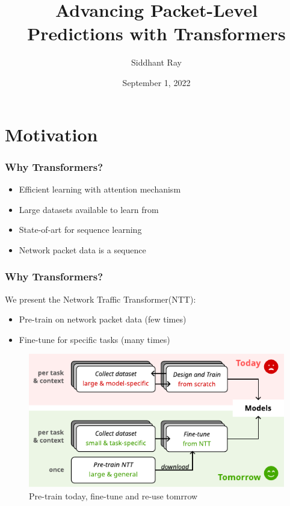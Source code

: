 \documentclass{beamer}
\title[Master Thesis] %
{Advancing Packet-Level Predictions with Transformers}
\date{September 1, 2022}
\author[Siddhant Ray] %
{Siddhant Ray}
\institute[ETH Zürich] %
{
  Dept. of Information Technology and Electrical Engineering(D-ITET) \\
  ETH Zürich
}
\begin{document}
\frame{\titlepage}


%


\section{Motivation}

\begin{frame}
\frametitle{Why Transformers?}

\begin{itemize}
    \item<1-> Efficient learning with attention mechanism
    \item<1-> Large datasets available to learn from
    \item<2-> State-of-art for sequence learning 
     \item<2-> Network packet data is a sequence
\end{itemize}
\end{frame}

\begin{frame}
\frametitle{Why Transformers?}

We present the Network Traffic Transformer(NTT):
\pause

 \begin{itemize}  
    \item<1-> Pre-train on network packet data (few times)
    \item<1-> Fine-tune for specific tasks (many times)
\end{itemize}

\begin{figure}[!hbt]
  \begin{center}
    \includegraphics[scale=0.8]{figures/vision.pdf}
    \caption{Pre-train today, fine-tune and re-use tomrrow}
    \label{fig:vision}
  \end{center}
\end{figure}
    
    
\end{frame}
\end{document}
